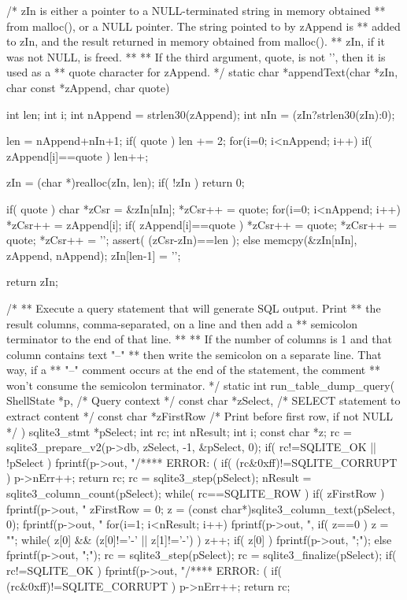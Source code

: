 \begin{Codex}[label=shell.c,numbers=left]
{/* zIn is either a pointer to a NULL-terminated string in memory obtained
** from malloc(), or a NULL pointer. The string pointed to by zAppend is
** added to zIn, and the result returned in memory obtained from malloc().
** zIn, if it was not NULL, is freed.
**
** If the third argument, quote, is not '\0', then it is used as a 
** quote character for zAppend.
*/
static char *appendText(char *zIn, char const *zAppend, char quote){
  int len;
  int i;
  int nAppend = strlen30(zAppend);
  int nIn = (zIn?strlen30(zIn):0);

  len = nAppend+nIn+1;
  if( quote ){
    len += 2;
    for(i=0; i<nAppend; i++){
      if( zAppend[i]==quote ) len++;
    }
  }

  zIn = (char *)realloc(zIn, len);
  if( !zIn ){
    return 0;
  }

  if( quote ){
    char *zCsr = &zIn[nIn];
    *zCsr++ = quote;
    for(i=0; i<nAppend; i++){
      *zCsr++ = zAppend[i];
      if( zAppend[i]==quote ) *zCsr++ = quote;
    }
    *zCsr++ = quote;
    *zCsr++ = '\0';
    assert( (zCsr-zIn)==len );
  }else{
    memcpy(&zIn[nIn], zAppend, nAppend);
    zIn[len-1] = '\0';
  }

  return zIn;
}


/*
** Execute a query statement that will generate SQL output.  Print
** the result columns, comma-separated, on a line and then add a
** semicolon terminator to the end of that line.
**
** If the number of columns is 1 and that column contains text "--"
** then write the semicolon on a separate line.  That way, if a 
** "--" comment occurs at the end of the statement, the comment
** won't consume the semicolon terminator.
*/
static int run_table_dump_query(
  ShellState *p,           /* Query context */
  const char *zSelect,     /* SELECT statement to extract content */
  const char *zFirstRow    /* Print before first row, if not NULL */
){
  sqlite3_stmt *pSelect;
  int rc;
  int nResult;
  int i;
  const char *z;
  rc = sqlite3_prepare_v2(p->db, zSelect, -1, &pSelect, 0);
  if( rc!=SQLITE_OK || !pSelect ){
    fprintf(p->out, "/**** ERROR: (%
    if( (rc&0xff)!=SQLITE_CORRUPT ) p->nErr++;
    return rc;
  }
  rc = sqlite3_step(pSelect);
  nResult = sqlite3_column_count(pSelect);
  while( rc==SQLITE_ROW ){
    if( zFirstRow ){
      fprintf(p->out, "%
      zFirstRow = 0;
    }
    z = (const char*)sqlite3_column_text(pSelect, 0);
    fprintf(p->out, "%
    for(i=1; i<nResult; i++){ 
      fprintf(p->out, ",%
    }
    if( z==0 ) z = "";
    while( z[0] && (z[0]!='-' || z[1]!='-') ) z++;
    if( z[0] ){
      fprintf(p->out, "\n;\n");
    }else{
      fprintf(p->out, ";\n");
    }    
    rc = sqlite3_step(pSelect);
  }
  rc = sqlite3_finalize(pSelect);
  if( rc!=SQLITE_OK ){
    fprintf(p->out, "/**** ERROR: (%
    if( (rc&0xff)!=SQLITE_CORRUPT ) p->nErr++;
  }
  return rc;
}

}
\end{Codex}
